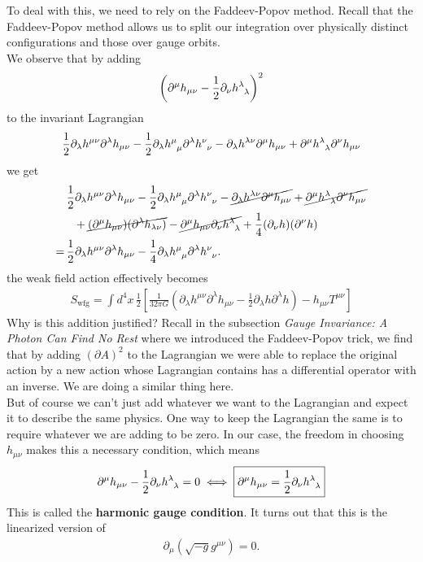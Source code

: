 \documentclass{book}
\theoremstyle{definition}
\newcommand{\p}{\partial}
\newcommand{\nn}{\nonumber}
\newcommand{\f}[2]{\frac{#1}{#2}}
\newcommand{\lp}{\left(}
\newcommand{\rp}{\right)}
\newcommand{\lb}{\left[}
\newcommand{\rb}{\right]}
\begin{document}
To deal with this, we need to rely on the Faddeev-Popov method. Recall that the Faddeev-Popov method allows us to split our integration over physically distinct configurations and those over gauge orbits.\\

We observe that by adding 
\begin{align}
\lp \p^\mu h_{\mu\nu} - \f{1}{2}\p_\nu \tensor{h}{^\lambda_\lambda} \rp^2
\end{align}
to the invariant Lagrangian
\begin{align}
\f{1}{2}\p_\lambda h^{\mu\nu}\p^\lambda h_{\mu\nu} -\f{1}{2} \p_\lambda \tensor{h}{^\mu_\mu} \p^\lambda \tensor{h}{^\nu_\nu} -\p_\lambda h^{\lambda \nu}\p^\mu h_{\mu\nu} + \p^\mu \tensor{h}{^\lambda_\lambda}\p^\nu h_{\mu\nu}
\end{align}
we get
\begin{align}
&\,\f{1}{2}\p_\lambda h^{\mu\nu}\p^\lambda h_{\mu\nu} -\f{1}{2} \p_\lambda \tensor{h}{^\mu_\mu} \p^\lambda \tensor{h}{^\nu_\nu} -\cancel{\p_\lambda h^{\lambda \nu}\p^\mu h_{\mu\nu}} + \cancel{\p^\mu \tensor{h}{^\lambda_\lambda}\p^\nu h_{\mu\nu}}\nn\\
&\,\,\,\,\,+ \cancel{(\p^\mu h_{\mu\nu})(\p^\lambda h_{\lambda \nu})} - \cancel{\p^\mu h_{\mu\nu}\p_\nu \tensor{h}{^\lambda_\lambda}} + \f{1}{4}(\p_\nu h)(\p^\nu h)\nn\\
=&\, \f{1}{2}\p_\lambda h^{\mu\nu}\p^\lambda h_{\mu\nu} -\f{1}{4} \p_\lambda \tensor{h}{^\mu_\mu} \p^\lambda \tensor{h}{^\nu_\nu}. 
\end{align}
the weak field action effectively becomes
\begin{align}
\boxed{S_\text{wfg} = \int d^4x\, \f{1}{2}\lb \f{1}{32\pi G}\lp \p_\lambda h^{\mu\nu} \p^\lambda h_{\mu\nu} - \f{1}{2}\p_\lambda h\p^\lambda h \rp - h_{\mu\nu}T^{\mu\nu} \rb}
\end{align}
Why is this addition justified? Recall in the subsection \textit{Gauge Invariance: A Photon Can Find No Rest} where we introduced the Faddeev-Popov trick, we find that by adding $(\p A)^2$ to the Lagrangian we were able to replace the original action by a new action whose Lagrangian contains has a differential operator with an inverse. We are doing a similar thing here. \\

But of course we can't just add whatever we want to the Lagrangian and expect it to describe the same physics. One way to keep the Lagrangian the same is to require whatever we are adding to be zero. In our case, the freedom in choosing $h_{\mu\nu}$ makes this a necessary condition, which means
\begin{align}
\p^\mu h_{\mu\nu} - \f{1}{2}\p_\nu \tensor{h}{^\lambda_\lambda}  = 0 \iff \boxed{\p^\mu h_{\mu\nu} = \f{1}{2}\p_\nu \tensor{h}{^\lambda_\lambda}}
\end{align} 
This is called the \textbf{harmonic gauge condition}. It turns out that this is the linearized version of
\begin{align}
\p_\mu \lp \sqrt{-g}g^{\mu\nu} \rp = 0.
\end{align}
\end{document}
